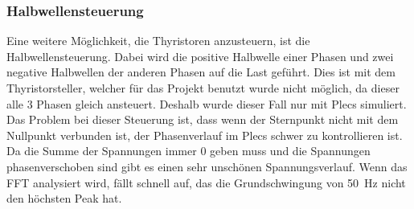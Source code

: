 \subsubsection*{Halbwellensteuerung}
Eine weitere Möglichkeit, die Thyristoren anzusteuern, ist die Halbwellensteuerung. Dabei wird die positive Halbwelle einer Phasen und zwei negative Halbwellen der anderen Phasen auf die Last geführt. Dies ist mit dem Thyristorsteller, welcher für das Projekt benutzt wurde nicht möglich, da dieser alle 3 Phasen gleich ansteuert. Deshalb wurde dieser Fall nur mit Plecs simuliert.  Das Problem bei dieser Steuerung ist, dass wenn der Sternpunkt nicht mit dem Nullpunkt verbunden ist, der Phasenverlauf im Plecs schwer zu kontrollieren ist. Da die Summe der Spannungen immer 0 geben muss und die Spannungen phasenverschoben sind gibt es einen sehr unschönen Spannungsverlauf. Wenn das FFT analysiert wird, fällt schnell auf, das die Grundschwingung von \SI{50}{Hz} nicht den höchsten Peak hat.



